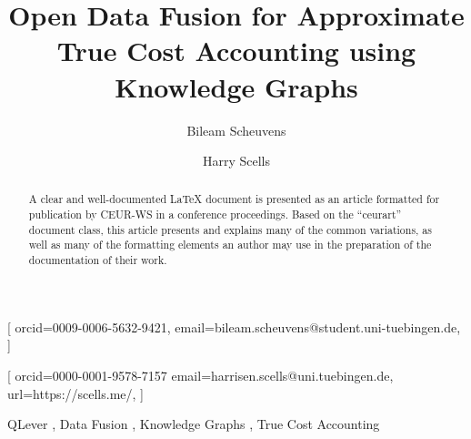 \documentclass[
]{./CEURART/ceurart}
\begin{document}


\title{Open Data Fusion for Approximate True Cost Accounting using Knowledge Graphs}


\author[1]{Bileam Scheuvens}[
	orcid=0009-0006-5632-9421,
	email=bileam.scheuvens@student.uni-tuebingen.de,
]
\cormark[1]
\address[1]{Eberhard Karls Universität Tübingen, Geschwister-Scholl-Platz, 72074 Tübingen, Germany}

\author[1]{Harry Scells}[
	orcid=0000-0001-9578-7157
	email=harrisen.scells@uni.tuebingen.de,
	url=https://scells.me/,
]

%

\begin{abstract}
	A clear and well-documented \LaTeX{} document is presented as an
	article formatted for publication by CEUR-WS in a conference
	proceedings. Based on the ``ceurart'' document class, this article
	presents and explains many of the common variations, as well as many
	of the formatting elements an author may use in the preparation of
	the documentation of their work.
\end{abstract}

\begin{keywords}
	QLever \sep
	Data Fusion \sep
	Knowledge Graphs \sep
	True Cost Accounting
\end{keywords}
\end{document}
